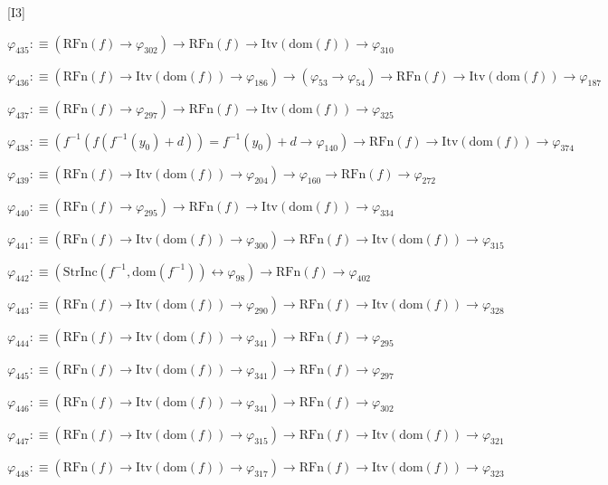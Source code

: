 \begin{fullproof}{[I3]}
\begin{abbrevlist}
\item $\varphi_{435} :\equiv (\mathrm{RFn}(f) \to \varphi_{302}) \to \mathrm{RFn}(f) \to \mathrm{Itv}(\mathrm{dom}(f)) \to \varphi_{310}$
\item $\varphi_{436} :\equiv (\mathrm{RFn}(f) \to \mathrm{Itv}(\mathrm{dom}(f)) \to \varphi_{186}) \to (\varphi_{53} \to \varphi_{54}) \to \mathrm{RFn}(f) \to \mathrm{Itv}(\mathrm{dom}(f)) \to \varphi_{187}$
\item $\varphi_{437} :\equiv (\mathrm{RFn}(f) \to \varphi_{297}) \to \mathrm{RFn}(f) \to \mathrm{Itv}(\mathrm{dom}(f)) \to \varphi_{325}$
\item $\varphi_{438} :\equiv (f^{-1}(f(f^{-1}(y_{0}) + d)) = f^{-1}(y_{0}) + d \to \varphi_{140}) \to \mathrm{RFn}(f) \to \mathrm{Itv}(\mathrm{dom}(f)) \to \varphi_{374}$
\item $\varphi_{439} :\equiv (\mathrm{RFn}(f) \to \mathrm{Itv}(\mathrm{dom}(f)) \to \varphi_{204}) \to \varphi_{160} \to \mathrm{RFn}(f) \to \varphi_{272}$
\item $\varphi_{440} :\equiv (\mathrm{RFn}(f) \to \varphi_{295}) \to \mathrm{RFn}(f) \to \mathrm{Itv}(\mathrm{dom}(f)) \to \varphi_{334}$
\item $\varphi_{441} :\equiv (\mathrm{RFn}(f) \to \mathrm{Itv}(\mathrm{dom}(f)) \to \varphi_{300}) \to \mathrm{RFn}(f) \to \mathrm{Itv}(\mathrm{dom}(f)) \to \varphi_{315}$
\item $\varphi_{442} :\equiv (\mathrm{StrInc}(f^{-1},\mathrm{dom}(f^{-1})) \leftrightarrow \varphi_{98}) \to \mathrm{RFn}(f) \to \varphi_{402}$
\item $\varphi_{443} :\equiv (\mathrm{RFn}(f) \to \mathrm{Itv}(\mathrm{dom}(f)) \to \varphi_{290}) \to \mathrm{RFn}(f) \to \mathrm{Itv}(\mathrm{dom}(f)) \to \varphi_{328}$
\item $\varphi_{444} :\equiv (\mathrm{RFn}(f) \to \mathrm{Itv}(\mathrm{dom}(f)) \to \varphi_{341}) \to \mathrm{RFn}(f) \to \varphi_{295}$
\item $\varphi_{445} :\equiv (\mathrm{RFn}(f) \to \mathrm{Itv}(\mathrm{dom}(f)) \to \varphi_{341}) \to \mathrm{RFn}(f) \to \varphi_{297}$
\item $\varphi_{446} :\equiv (\mathrm{RFn}(f) \to \mathrm{Itv}(\mathrm{dom}(f)) \to \varphi_{341}) \to \mathrm{RFn}(f) \to \varphi_{302}$
\item $\varphi_{447} :\equiv (\mathrm{RFn}(f) \to \mathrm{Itv}(\mathrm{dom}(f)) \to \varphi_{315}) \to \mathrm{RFn}(f) \to \mathrm{Itv}(\mathrm{dom}(f)) \to \varphi_{321}$
\item $\varphi_{448} :\equiv (\mathrm{RFn}(f) \to \mathrm{Itv}(\mathrm{dom}(f)) \to \varphi_{317}) \to \mathrm{RFn}(f) \to \mathrm{Itv}(\mathrm{dom}(f)) \to \varphi_{323}$

\end{abbrevlist}
\end{fullproof}
